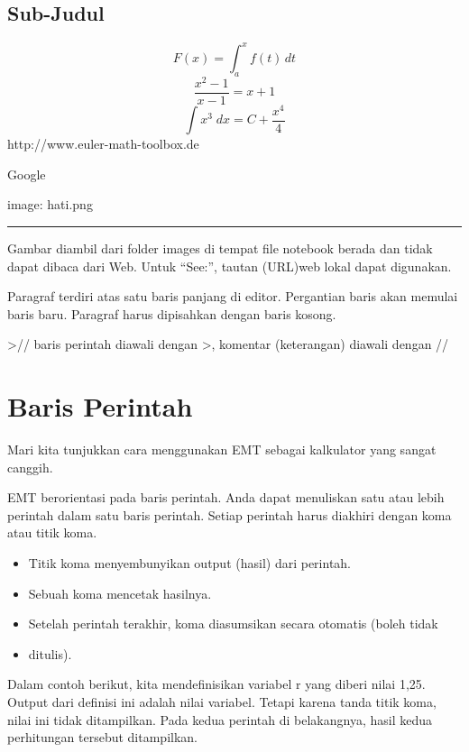 \documentclass[
]{book}
\begin{document}
\section{Sub-Judul}\label{sub-judul}

\[F(x) = \int_a^x f(t) \, dt\]\[\frac{x^2-1}{x-1} = x + 1\] \[\int {x^3}{\;dx}=C+\frac{x^4}{4}\] http://www.euler-math-toolbox.de

Google

image: hati.png

\begin{center}\rule{0.5\linewidth}{0.5pt}\end{center}

Gambar diambil dari folder images di tempat file notebook berada dan tidak dapat dibaca dari Web. Untuk ``See:'', tautan (URL)web lokal dapat digunakan.

Paragraf terdiri atas satu baris panjang di editor. Pergantian baris akan memulai baris baru. Paragraf harus dipisahkan dengan baris kosong.

\textgreater// baris perintah diawali dengan \textgreater, komentar (keterangan) diawali dengan //

\chapter{Baris Perintah}\label{baris-perintah}

Mari kita tunjukkan cara menggunakan EMT sebagai kalkulator yang sangat canggih.

EMT berorientasi pada baris perintah. Anda dapat menuliskan satu atau lebih perintah dalam satu baris perintah. Setiap perintah harus diakhiri dengan koma atau titik koma.

\begin{itemize}
\item
  Titik koma menyembunyikan output (hasil) dari perintah.
\item
  Sebuah koma mencetak hasilnya.
\item
  Setelah perintah terakhir, koma diasumsikan secara otomatis (boleh tidak
\item
  ditulis).
\end{itemize}

Dalam contoh berikut, kita mendefinisikan variabel r yang diberi nilai 1,25. Output dari definisi ini adalah nilai variabel. Tetapi karena tanda titik koma, nilai ini tidak ditampilkan. Pada kedua perintah di belakangnya, hasil kedua perhitungan tersebut ditampilkan.
\end{document}
